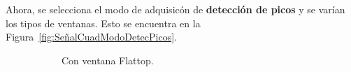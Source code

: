     Ahora, se selecciona el modo de adquisicón de \textbf{detección de picos} y se varían los tipos de ventanas.
    Esto se encuentra en la Figura~\ref{fig:SeñalCuadModoDetecPicos}.
    \begin{figure}[H]
      \centering
      \begin{subfigure}[H]{0.40\textwidth}
        \caption{Con ventana Flattop.}
      \end{subfigure}
      \hfill 
      \begin{subfigure}[H]{0.40\textwidth}

\end{subfigure}
\end{figure}
